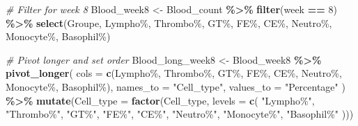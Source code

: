 \documentclass[
]{article}
\newenvironment{Shaded}{\begin{snugshade}}{\end{snugshade}}
\newcommand{\AttributeTok}[1]{\textcolor[rgb]{0.13,0.29,0.53}{#1}}
\newcommand{\CommentTok}[1]{\textcolor[rgb]{0.56,0.35,0.01}{\textit{#1}}}
\newcommand{\DecValTok}[1]{\textcolor[rgb]{0.00,0.00,0.81}{#1}}
\newcommand{\FunctionTok}[1]{\textcolor[rgb]{0.13,0.29,0.53}{\textbf{#1}}}
\newcommand{\NormalTok}[1]{#1}
\newcommand{\OtherTok}[1]{\textcolor[rgb]{0.56,0.35,0.01}{#1}}
\newcommand{\SpecialCharTok}[1]{\textcolor[rgb]{0.81,0.36,0.00}{\textbf{#1}}}
\newcommand{\StringTok}[1]{\textcolor[rgb]{0.31,0.60,0.02}{#1}}
\begin{document}
\begin{Shaded}
\begin{Highlighting}[]
\CommentTok{\# Filter for week 8}
\NormalTok{Blood\_week8 }\OtherTok{\textless{}{-}}\NormalTok{ Blood\_count }\SpecialCharTok{\%\textgreater{}\%}
  \FunctionTok{filter}\NormalTok{(week }\SpecialCharTok{==} \DecValTok{8}\NormalTok{) }\SpecialCharTok{\%\textgreater{}\%}
  \FunctionTok{select}\NormalTok{(Groupe, }\StringTok{\textasciigrave{}}\AttributeTok{Lympho\%}\StringTok{\textasciigrave{}}\NormalTok{, }\StringTok{\textasciigrave{}}\AttributeTok{Thrombo\%}\StringTok{\textasciigrave{}}\NormalTok{, }\StringTok{\textasciigrave{}}\AttributeTok{GT\%}\StringTok{\textasciigrave{}}\NormalTok{, }\StringTok{\textasciigrave{}}\AttributeTok{FE\%}\StringTok{\textasciigrave{}}\NormalTok{, }\StringTok{\textasciigrave{}}\AttributeTok{CE\%}\StringTok{\textasciigrave{}}\NormalTok{, }\StringTok{\textasciigrave{}}\AttributeTok{Neutro\%}\StringTok{\textasciigrave{}}\NormalTok{, }\StringTok{\textasciigrave{}}\AttributeTok{Monocyte\%}\StringTok{\textasciigrave{}}\NormalTok{, }\StringTok{\textasciigrave{}}\AttributeTok{Basophil\%}\StringTok{\textasciigrave{}}\NormalTok{)}

\CommentTok{\# Pivot longer and set order}
\NormalTok{Blood\_long\_week8 }\OtherTok{\textless{}{-}}\NormalTok{ Blood\_week8 }\SpecialCharTok{\%\textgreater{}\%}
  \FunctionTok{pivot\_longer}\NormalTok{(}
    \AttributeTok{cols =} \FunctionTok{c}\NormalTok{(}\StringTok{\textasciigrave{}}\AttributeTok{Lympho\%}\StringTok{\textasciigrave{}}\NormalTok{, }\StringTok{\textasciigrave{}}\AttributeTok{Thrombo\%}\StringTok{\textasciigrave{}}\NormalTok{, }\StringTok{\textasciigrave{}}\AttributeTok{GT\%}\StringTok{\textasciigrave{}}\NormalTok{, }\StringTok{\textasciigrave{}}\AttributeTok{FE\%}\StringTok{\textasciigrave{}}\NormalTok{, }\StringTok{\textasciigrave{}}\AttributeTok{CE\%}\StringTok{\textasciigrave{}}\NormalTok{, }\StringTok{\textasciigrave{}}\AttributeTok{Neutro\%}\StringTok{\textasciigrave{}}\NormalTok{, }\StringTok{\textasciigrave{}}\AttributeTok{Monocyte\%}\StringTok{\textasciigrave{}}\NormalTok{, }\StringTok{\textasciigrave{}}\AttributeTok{Basophil\%}\StringTok{\textasciigrave{}}\NormalTok{),}
    \AttributeTok{names\_to =} \StringTok{"Cell\_type"}\NormalTok{,}
    \AttributeTok{values\_to =} \StringTok{"Percentage"}
\NormalTok{  ) }\SpecialCharTok{\%\textgreater{}\%}
  \FunctionTok{mutate}\NormalTok{(}\AttributeTok{Cell\_type =} \FunctionTok{factor}\NormalTok{(Cell\_type, }\AttributeTok{levels =} \FunctionTok{c}\NormalTok{(}
    \StringTok{"Lympho\%"}\NormalTok{, }\StringTok{"Thrombo\%"}\NormalTok{, }\StringTok{"GT\%"}\NormalTok{, }\StringTok{"FE\%"}\NormalTok{, }\StringTok{"CE\%"}\NormalTok{, }\StringTok{"Neutro\%"}\NormalTok{, }\StringTok{"Monocyte\%"}\NormalTok{, }\StringTok{"Basophil\%"}
\NormalTok{  )))}


\end{Highlighting}
\end{Shaded}
\end{document}
